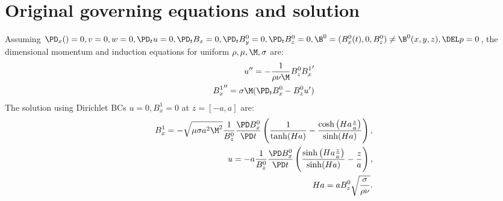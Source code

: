 \documentclass[11pt]{article}
\begin{document}
\doublespacing
\MOONSTITLE
\maketitle

\section{Original governing equations and solution}
Assuming $\PD_x () =0, v=0,w=0, \PD_t u = 0, \PD_t B_x = 0,\PD_t B_y^0 = 0, \PD_t B_z^0 = 0,\B^0 = (B_x^0(t),0,B_z^0) \ne \B^0(x,y,z), \DEL p =0$, the dimensional momentum and induction equations for uniform $\rho,\mu,\M,\sigma$ are:
\begin{equation}\begin{aligned}
u''   = - \frac{1}{\rho \nu \M} B_z^0 {B_x^1}' \\
{B_x^1}'' = \sigma \M (\PD_t B_x^0 - B_z^0 u') \\
\end{aligned} \end{equation}
\noindent
The solution using Dirichlet BCs $u=0,B_x^1 = 0$ at $z=[-a,a]$ are:
\begin{equation}\begin{aligned}
B_x^1 = - \sqrt{\mu \sigma a^2 \M^2} \frac{1}{B_z^0} \frac{\PD B_x^0}{\PD t} \left( \frac{1}{\tanh(Ha)} -  \frac{\cosh \left(Ha \frac{z}{a} \right)}{\sinh(Ha)}\right), \\
u   = -a \frac{1}{B_z^0} \frac{\PD B_x^0}{\PD t} \left( \frac{\sinh\left(Ha \frac{z}{a} \right)}{\sinh(Ha)} - \frac{z}{a} \right), \\
Ha = a B_z^0 \sqrt{\frac{\sigma}{\rho \nu}}. \\
\end{aligned} \end{equation}
\end{document}
